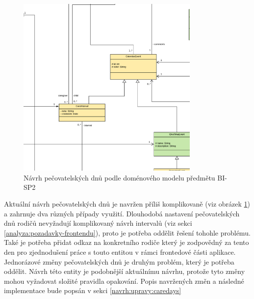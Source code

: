         \begin{figure}\centering
            \includegraphics[width=0.8\textwidth]{pdfs/CareDays1}
            \caption[Současný návrh pečovatelských dnů]{Návrh pečovatelských dnů podle doménového modelu předmětu BI-SP2}\label{image:caredays1}
        \end{figure}
        Aktuální návrh pečovatelských dnů je navržen příliš komplikovaně (viz obrázek \ref{image:caredays1}) a zahrnuje dva různých případy využití. Dlouhodobá nastavení pečovatelských dnů rodičů nevyžadují komplikovaný návrh intervalů (viz sekci \ref{analyza:pozadavky-frontendu}), proto je potřeba oddělit řešení tohohle problému. Také je potřeba přidat odkaz na konkretního rodiče který je zodpovědný za tento den pro zjednodušení práce s touto entitou v rámci frontedové části aplikace. Jednorázové změny pečovatelských dnů je druhým problém, který je potřeba oddělit. Návrh této entity je podobnější aktuálnímu návrhu, protože tyto změny mohou vyžadovat složité pravidla opakování. Popis navržených změn a následné implementace bude popsán v sekci \ref{navrh:upravy:caredays}
        

